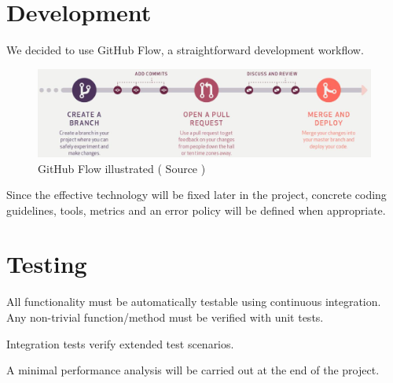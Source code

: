 \section{Development}

We decided to use GitHub Flow\cite{github-flow}, a straightforward development workflow.

\begin{figure}[H]
    \centering
    \includegraphics[width=0.85\linewidth]{resources/github_flow}
    \caption[Organigram]{GitHub Flow illustrated ( Source \cite{github-flow})}
    \label{fig:organigram}
\end{figure}


Since the effective technology will be fixed later in the project, concrete coding guidelines, tools, metrics and an error policy will be defined when appropriate.


\section{Testing}
All functionality must be automatically testable using continuous integration. Any non-trivial function/method must be verified with unit tests.

Integration tests verify extended test scenarios.

A minimal performance analysis will be carried out at the end of the project.



\label{lastpage}

\backmatter
{}






\listoffigures %

